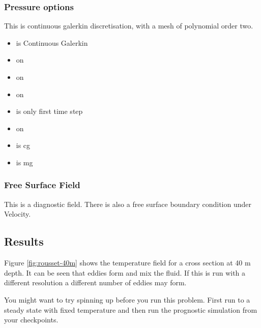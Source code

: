 \subsubsection{Pressure options}

This is continuous galerkin discretisation, with a mesh of polynomial order two.
\begin{itemize}
\item {} is Continuous Galerkin
\item {}  on
\item {} on
\item {}  on
\item {} is only first time step
\item {}  on
\item {} is  cg 
\item {} is  mg
\end{itemize}

\subsubsection{Free Surface Field}
This is a diagnostic field. There is also a free surface boundary condition under Velocity.

\subsection{Results}

Figure \ref{fig:rousset-40m} shows the temperature field for a cross section at 40 m depth. It can be seen that eddies form and mix the fluid. If this is run with a different resolution a different number of eddies may form.

You might want to try spinning up before you run this problem.  First run to a steady state with fixed temperature and then run the prognostic simulation from your checkpoints.


